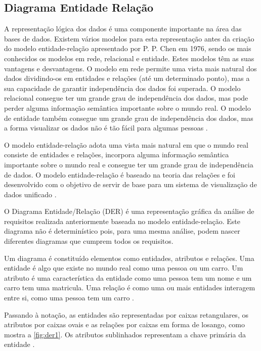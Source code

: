 \documentclass[11pt,twoside,a4paper]{report}
\begin{document}
\subsection{Diagrama Entidade Relação}
\label{subchap:DER}
A representação lógica dos dados é uma componente importante na área das bases de dados. Existem vários modelos para esta representação antes da criação do modelo entidade-relação apresentado por P. P. Chen em 1976, sendo os mais conhecidos os modelos em rede, relacional e entidade. Estes modelos têm as suas vantagens e desvantagens. O modelo em rede permite uma vista mais natural dos dados dividindo-os em entidades e relações (até um determinado ponto), mas a sua capacidade de garantir independência dos dados foi superada. O modelo relacional consegue ter um grande grau de independência dos dados, mas pode perder alguma informação semântica importante sobre o mundo real. O modelo de entidade também consegue um grande grau de independência dos dados, mas a forma visualizar os dados não é tão fácil para algumas pessoas \cite{analise_requisitos,Chen}.\par
O modelo entidade-relação adota uma vista mais natural em que o mundo real consiste de entidades e relações, incorpora alguma informação semântica importante sobre o mundo real e consegue ter um grande grau de independência de dados. O modelo entidade-relação é baseado na teoria das relações e foi desenvolvido com o objetivo de servir de base para um sistema de visualização de dados unificado \cite{analise_requisitos,Chen}.\par
O Diagrama Entidade/Relação (DER) é uma representação gráfica da análise de requisitos realizada anteriormente baseada no modelo entidade-relação. Este diagrama não é determinístico pois, para uma mesma análise, podem nascer diferentes diagramas que cumprem todos os requisitos.\par
Um diagrama é constituído elementos como entidades, atributos e relações. Uma entidade é algo que existe no mundo real como uma pessoa ou um carro. Um atributo é uma característica da entidade como uma pessoa tem um nome e um carro tem uma matricula. Uma relação é como uma ou mais entidades interagem entre si, como uma pessoa tem um carro \cite{analise_requisitos,Chen}.\par 
Passando à notação, as entidades são representadas por caixas retangulares, os atributos por caixas ovais e as relações por caixas em forma de losango, como mostra a \autoref{fig:der1}. Os atributos sublinhados representam a chave primária da entidade \cite{analise_requisitos,Chen}.
\end{document}
